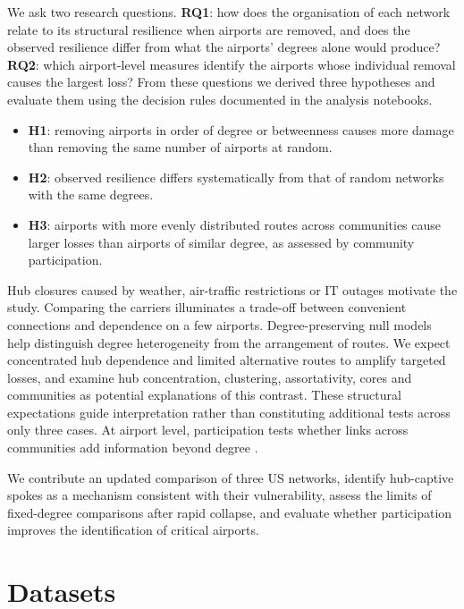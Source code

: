 \documentclass[12pt, a4paper]{article}
\begin{document}
We ask two research questions. \textbf{RQ1}: how does the organisation of each
network relate to its structural resilience when airports are removed, and does the
observed resilience differ from what the airports' degrees alone would produce?
\textbf{RQ2}: which airport-level measures identify the airports whose individual
removal causes the largest loss? From these questions we derived three hypotheses and
evaluate them using the decision rules documented in the analysis notebooks.

\begin{itemize}
\item \textbf{H1}: removing airports in order of degree or betweenness causes more
damage than removing the same number of airports at random.
\item \textbf{H2}: observed resilience differs systematically from that of random
networks with the same degrees.
\item \textbf{H3}: airports with more evenly distributed routes across communities cause larger losses
than airports of similar degree, as assessed by community participation.
\end{itemize}

Hub closures caused by weather, air-traffic restrictions or IT outages motivate the study. Comparing the carriers illuminates a trade-off between convenient connections and dependence on a few airports. Degree-preserving null models \cite{maslov2002,fosdick2018} help distinguish degree heterogeneity from the arrangement of routes. We expect concentrated hub dependence and limited alternative routes to amplify targeted losses, and examine hub concentration, clustering, assortativity, cores and communities as potential explanations of this contrast. These structural expectations guide interpretation rather than constituting additional tests across only three cases. At airport level, participation tests whether links across communities add information beyond degree \cite{guimera2005b}.

We contribute an updated comparison of three US networks, identify hub-captive spokes as a mechanism consistent with their vulnerability, assess the limits of fixed-degree comparisons after rapid collapse, and evaluate whether participation improves the identification of critical airports.

\section{Datasets}
\label{datasets}
\end{document}
